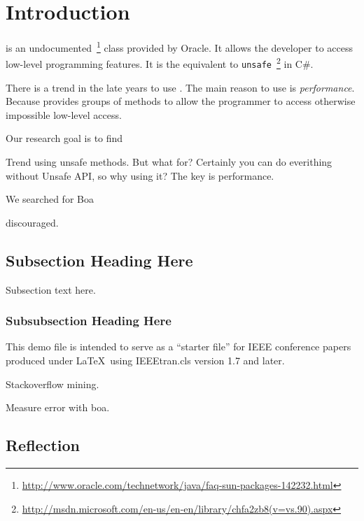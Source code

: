 
\section{Introduction} \label{sec:introduction}

\smu{} is an undocumented~\footnote{\url{http://www.oracle.com/technetwork/java/faq-sun-packages-142232.html}} class provided by Oracle.
It allows the developer to access low-level programming features.
It is the equivalent to \texttt{unsafe}~\footnote{\url{http://msdn.microsoft.com/en-us/en-en/library/chfa2zb8(v=vs.90).aspx}} in C\#.

There is a trend in the late years to use \smu{}.
The main reason to use \smu{} is \emph{performance}.
Because \smu{} provides groups of methods to allow the programmer to access otherwise impossible low-level access. 




Our research goal is to find 

Trend using unsafe methods. But what for? Certainly you can do everithing without Unsafe API, so why using it? The key is performance.

We searched for Boa \cite{Dyer-Nguyen-Rajan-Nguyen-13}

 discouraged. 
 


\subsection{Subsection Heading Here}
Subsection text here.


\subsubsection{Subsubsection Heading Here}

%


This demo file is intended to serve as a ``starter file''
for IEEE conference papers produced under \LaTeX\ using
IEEEtran.cls version 1.7 and later.


Stackoverflow mining.

Measure error with boa.

\subsection{Reflection}

